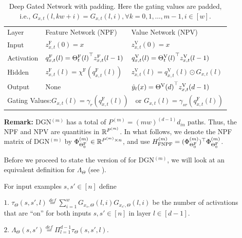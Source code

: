 \begin{appendix}
\begin{table}
\centering
\begin{tabular}{|l|l|l|}\hline
Layer& Feature Network (NPF)& Value Network (NPV)\\
Input & $z^{\text{F}}_{x,t}(0)=x$ &$z^{\text{V}}_{x,t}(0)=x$ \\
Activation & $q^{\text{F}}_{x,t}(l)={{\Theta}^{\text{F}}_t(l)}^\top z^{\text{F}}_{x,t}(l-1)$& $q^{\text{V}}_{x,t}(l)={{\Theta}^{\text{V}}_t(l)}^\top z^{\text{V}}_{x,t}(l-1)$\\
Hidden &$z^{\text{F}}_{x,t}(l)=\chi^{\text{F}}\left(q^{\text{F}}_{x,t}(l)\right)$& $z^{\text{V}}_{x,t}(l)=q^{\text{V}}_{x,t}(l)\odot G_{x,t}(l)$ \\
Output & None &$\hat{y}_t(x)={{\Theta}^{\text{V}}(d)}^\top z^{\text{V}}_{x,t}(d-1)$\\\hline
\multicolumn{3}{|l|}{Gating Values:\quad$ G_{x,t}(l)= \gamma_{r}\left(q^{\text{F}}_{x,t}(l)\right)\quad$or $G_{x,t}(l)= \gamma_{sr}\left(q^{\text{F}}_{x,t}(l)\right)$}\\\hline
\end{tabular}
\caption{Deep Gated Network with padding. Here the gating values are padded, i.e., $ G_{x,t}(l,kw+i)=G_{x,t}(l,i),\forall k=0,1,\ldots,m-1, i\in[w]$. }
\label{tb:dgnpad}
\end{table}

\textbf{Remark:}  DGN${}^{(m)}$ has a total of $P^{(m)}=(mw)^{(d-1)}d_{in}$ paths. Thus, the NPF and NPV are quantities in $\mathbb{R}^{P^{(m)}}$. In what follows, we denote the NPF matrix of DGN${}^{(m)}$ by $\Phi^{(m)}_{{\Theta}^{\text{F}}_0}\in\mathbb{R}^{P^{(m)}\times n}$, and use $H^{(m)}_{\text{FNPF}}=(\Phi^{(m)}_{{\Theta}^{\text{F}}_0})^\top \Phi^{(m)}_{{\Theta}^{\text{F}}_0}$. 

Before we proceed to state the version of  for DGN${}^{(m)}$, we will look at an equivalent definition for $\Lambda_{\Theta}$ (see ).
\begin{definition}\label{def:equilambda}
For input examples $s, s'\in[n]$ define 

$1.$ $\tau_{\Theta}(s,s',l)\stackrel{def}=\sum_{i=1}^w G_{x_s,\Theta}(l,i)G_{x_{s'},\Theta}(l,i)$ be the number of activations that are ``on'' for both inputs $s,s'\in[n]$ in layer $l\in[d-1]$.

$2.$ $\Lambda_{\Theta}(s,s')\stackrel{def}=\Pi_{l=1}^{d-1}\tau_{\Theta}(s,s',l)$.
\end{definition}




\end{appendix}
